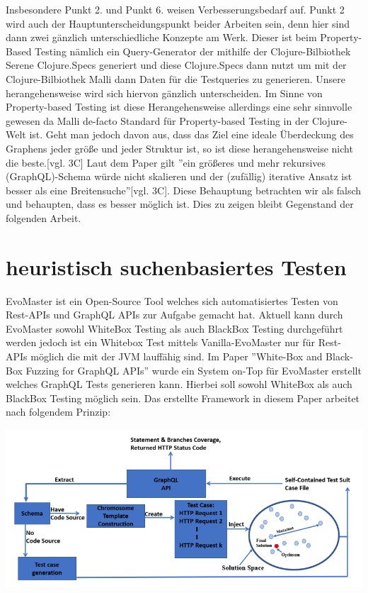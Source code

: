 Insbesondere Punkt 2. und Punkt 6. weisen Verbesserungsbedarf auf.
Punkt 2 wird auch der Hauptunterscheidungspunkt beider Arbeiten sein, denn hier sind dann zwei gänzlich unterschiedliche Konzepte am Werk.
Dieser ist beim Property-Based Testing nämlich ein Query-Generator der mithilfe der Clojure-Bilbiothek Serene\cite{clojureserene}
Clojure.Specs\cite{clojurespec} generiert und diese Clojure.Specs\cite{clojurespec} dann nutzt um mit der Clojure-Bilbiothek Malli\cite{clojuremalli} dann Daten für die Testqueries zu generieren.
Unsere herangehensweise wird sich hiervon gänzlich unterscheiden.
Im Sinne von Property-based Testing ist diese Herangehensweise allerdings eine sehr sinnvolle gewesen da Malli\cite{clojuremalli} de-facto Standard
für Property-based Testing in der Clojure-Welt ist.
Geht man jedoch davon aus, dass das Ziel eine ideale Überdeckung des Graphens jeder größe und jeder Struktur ist, so
ist diese herangehensweise nicht die beste.\cite{property-based-testing}[vgl. 3C]
Laut dem Paper gilt ''ein größeres und mehr rekursives (GraphQL)-Schema würde nicht skalieren und der (zufällig) iterative Ansatz ist besser als eine Breitensuche''\cite{property-based-testing}[vgl. 3C].
Diese Behauptung betrachten wir als falsch und behaupten, dass es besser möglich ist.
Dies zu zeigen bleibt Gegenstand der folgenden Arbeit.


\section{heuristisch suchenbasiertes Testen}

EvoMaster\cite{evo-master} ist ein Open-Source Tool welches sich automatisiertes Testen von Rest-APIs und GraphQL APIs zur Aufgabe gemacht hat.
Aktuell kann durch EvoMaster sowohl WhiteBox Testing als auch BlackBox Testing durchgeführt werden jedoch ist ein
Whitebox Test mittels Vanilla-EvoMaster nur für Rest-APIs möglich die mit der JVM lauffähig sind.
Im Paper ''White-Box and Black-Box Fuzzing for GraphQL APIs''\cite{belhadi2022whitebox} wurde ein System on-Top für EvoMaster
erstellt welches GraphQL Tests generieren kann.
Hierbei soll sowohl WhiteBox als auch BlackBox Testing möglich sein.
Das erstellte Framework in diesem Paper arbeitet nach folgendem Prinzip:

\begin{center}
    \includegraphics[width=\textwidth,height=\textheight,keepaspectratio]{content/hauptteil/relatedWork/evomaster_framework}
\end{center}

